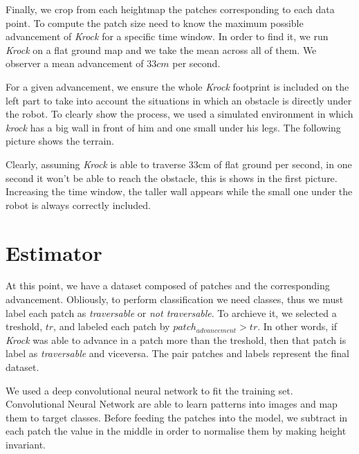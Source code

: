 \documentclass[../document.tex]{subfiles}
\begin{document}
Finally, we crop from each heightmap the patches corresponding to each data point. To compute the patch size need to know the maximum possible advancement of \emph{Krock} for a specific time window. In order to find it, we run \emph{Krock} on a flat ground map and we take the mean across all of them. We observer a mean advancement of $33cm$ per second.

For a given advancement, we ensure the whole \emph{Krock} footprint is included on the left part to take into account the situations in which an obstacle is directly under the robot. To clearly show the process, we used a simulated environment in which \emph{krock} has a big wall in front of him and one small under his legs. The following picture shows the terrain.


Clearly, assuming \emph{Krock} is able to traverse $33$cm of flat ground per second, in one second it won't be able to reach the obstacle, this is shows in the first picture. Increasing the time window, the taller wall appears while the small one under the robot is always correctly included.



\section{Estimator}
At this point, we have a dataset composed of patches and the corresponding advancement. Obliously, to perform classification we need classes, thus we must label each patch as \emph{traversable} or \emph{not traversable}. To archieve it, we selected a treshold, $tr$, and labeled each patch by $patch_{advancement} > tr$. In other words, if \emph{Krock} was able to advance in a patch more than the treshold, then that patch is label as \emph{traversable} and viceversa. The pair patches and labels represent the final dataset.

We used a deep convolutional neural network to fit the training set. Convolutional Neural Network are able to learn patterns into images and map them to target classes. 
Before feeding the patches into the model, we subtract in each patch the value in the middle in order to normalise them by making height invariant.
\end{document}
